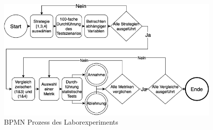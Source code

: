 \begin{figure}[htb]
    \centering
    \includegraphics[height=6cm]{lib/graphics/experimentflow.png}
    \caption[BPMN Prozess des Laborexperiments]{BPMN Prozess des Laborexperiments\footnotemark}
    \label{abb:experiment flow}
\end{figure}

